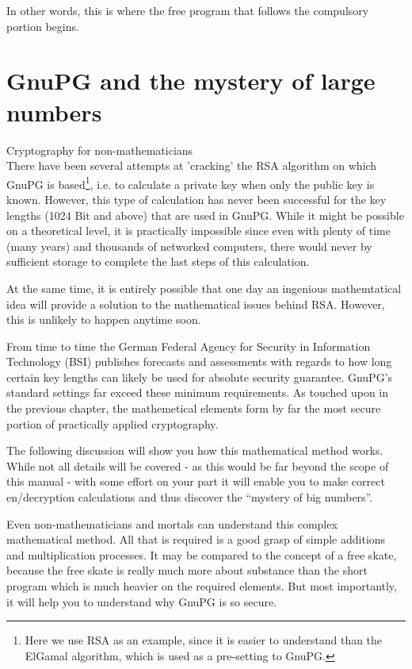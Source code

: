\documentclass[a4paper,11pt,oneside,openright,titlepage]{scrbook}
\begin{document}
In other words, this is where the free program that follows the
compulsory portion begins.



\clearpage
\chapter{GnuPG and the mystery of large numbers  }
\label{ch:secretGnupg}

{\Large Cryptography for non-mathematicians}\\

There have been several attempts at 'cracking' the RSA algorithm
 on which GnuPG is based\footnote{Here we use
RSA as an example, since it is easier to understand than the ElGamal
algorithm, which is used as a pre-setting to GnuPG.}, i.e. to
calculate a private key when only the public key is known.  However,
this type of calculation has never been successful for the key lengths
(1024 Bit and above) that are used in GnuPG. While it might be
possible on a theoretical level, it is practically impossible since
even with plenty of time (many years) and thousands of networked
computers, there would never by sufficient storage to complete the
last steps of this calculation.

At the same time, it is entirely possible that one day an ingenious
mathemtatical idea will provide a solution to the mathematical issues
behind RSA. However, this is unlikely to happen anytime soon.

From time to time the German Federal Agency for Security in
Information Technology (BSI) publishes forecasts and assessments with
regards to how long certain key lengths can likely be used for
absolute security guarantee.  GnuPG's standard settings far exceed
these minimum requirements. As touched upon in the previous chapter,
the mathemetical elements form by far the most secure portion of
practically applied cryptography.

\clearpage
The following discussion will show you how this
mathematical method works. While not all details will be covered - as
this would be far beyond the scope of this manual - with some effort
on your part it will enable you to make correct en/decryption
calculations and thus discover the ``mystery of big numbers''.

Even non-mathematicians and mortals can understand this complex
mathematical method. All that is required is a good grasp of simple
additions and multiplication processes. It may be compared to the
concept of a free skate, because the free skate is really much more
about substance than the short program which is much heavier on the
required elements. But most importantly, it will help you to
understand why GnuPG is so secure.
\end{document}
